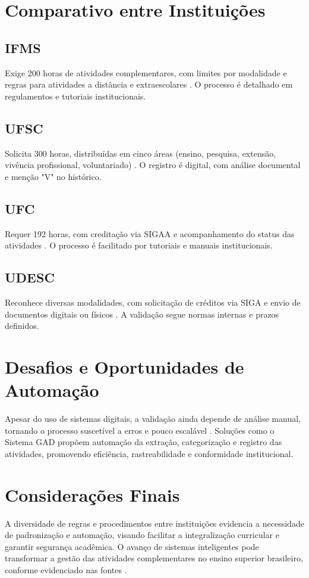 \section{Comparativo entre Instituições}
\subsection{IFMS}
Exige 200 horas de atividades complementares, com limites por modalidade e regras para atividades a distância e extraescolares \cite{ufsc_sistemas_2024}. O processo é detalhado em regulamentos e tutoriais institucionais.

\subsection{UFSC}
Solicita 300 horas, distribuídas em cinco áreas (ensino, pesquisa, extensão, vivência profissional, voluntariado) \cite{ufsc_sistemas_2024}. O registro é digital, com análise documental e menção "V" no histórico.

\subsection{UFC}
Requer 192 horas, com creditação via SIGAA e acompanhamento do status das atividades \cite{bayde_ribeiro_sistemas_2022}. O processo é facilitado por tutoriais e manuais institucionais.

\subsection{UDESC}
Reconhece diversas modalidades, com solicitação de créditos via SIGA e envio de documentos digitais ou físicos \cite{udesc_atividades_2012}. A validação segue normas internas e prazos definidos.

\section{Desafios e Oportunidades de Automação}
Apesar do uso de sistemas digitais, a validação ainda depende de análise manual, tornando o processo suscetível a erros e pouco escalável \cite{bayde_ribeiro_sistemas_2022, udesc_atividades_2012}. Soluções como o Sistema GAD propõem automação da extração, categorização e registro das atividades, promovendo eficiência, rastreabilidade e conformidade institucional.

\section{Considerações Finais}
 A diversidade de regras e procedimentos entre instituições evidencia a necessidade de padronização e automação, visando facilitar a integralização curricular e garantir segurança acadêmica. O avanço de sistemas inteligentes pode transformar a gestão das atividades complementares no ensino superior brasileiro, conforme evidenciado nas fontes \cite{ufsc_sistemas_2024, bayde_ribeiro_sistemas_2022, udesc_atividades_2012}.
